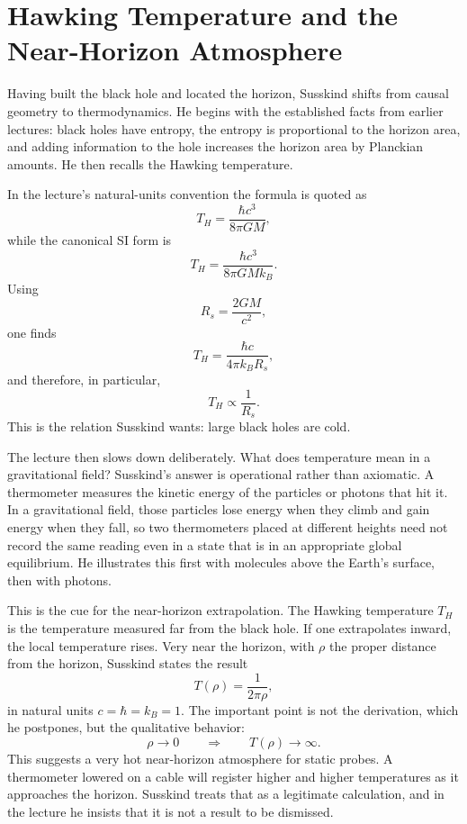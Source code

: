 \section{Hawking Temperature and the Near-Horizon Atmosphere}

Having built the black hole and located the horizon, Susskind shifts from causal geometry to thermodynamics. He begins with the established facts from earlier lectures: black holes have entropy, the entropy is proportional to the horizon area, and adding information to the hole increases the horizon area by Planckian amounts. He then recalls the Hawking temperature.

In the lecture's natural-units convention the formula is quoted as
\begin{equation}
T_H=\frac{\hbar c^3}{8\pi G M},
\end{equation}
while the canonical SI form is
\begin{equation}
T_H=\frac{\hbar c^3}{8\pi G M k_B}.
\end{equation}
Using
\begin{equation}
R_s=\frac{2GM}{c^2},
\end{equation}
one finds
\begin{equation}
T_H=\frac{\hbar c}{4\pi k_B R_s},
\end{equation}
and therefore, in particular,
\begin{equation}
T_H\propto \frac{1}{R_s}.
\end{equation}
This is the relation Susskind wants: large black holes are cold.

The lecture then slows down deliberately. What does temperature mean in a gravitational field? Susskind's answer is operational rather than axiomatic. A thermometer measures the kinetic energy of the particles or photons that hit it. In a gravitational field, those particles lose energy when they climb and gain energy when they fall, so two thermometers placed at different heights need not record the same reading even in a state that is in an appropriate global equilibrium. He illustrates this first with molecules above the Earth's surface, then with photons.

This is the cue for the near-horizon extrapolation. The Hawking temperature \(T_H\) is the temperature measured far from the black hole. If one extrapolates inward, the local temperature rises. Very near the horizon, with \(\rho\) the proper distance from the horizon, Susskind states the result
\begin{equation}
T(\rho)=\frac{1}{2\pi \rho},
\end{equation}
in natural units \(c=\hbar=k_B=1\). The important point is not the derivation, which he postpones, but the qualitative behavior:
\[
\rho\to 0 \qquad \Longrightarrow \qquad T(\rho)\to \infty.
\]
This suggests a very hot near-horizon atmosphere for static probes. A thermometer lowered on a cable will register higher and higher temperatures as it approaches the horizon. Susskind treats that as a legitimate calculation, and in the lecture he insists that it is not a result to be dismissed.

